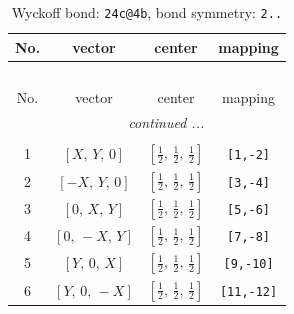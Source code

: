 \documentclass[fleqn,8pt]{jsarticle}
\begin{document}
\renewcommand{\arraystretch}{1.2}
\begin{longtable}{cccc}
\caption{Wyckoff bond: {\tt 24c@4b}, bond symmetry: {\tt 2..}}
 \\
 \hline \hline
No. & vector & center & mapping \\ \hline \endfirsthead

\multicolumn{3}{l}{\tablename\ \thetable{}} \\
 \hline \hline
No. & vector & center & mapping \\ \hline \endhead

 \hline \hline
\multicolumn{3}{r}{\footnotesize\it continued ...} \\ \endfoot

 \hline \hline
\multicolumn{3}{r}{} \\ \endlastfoot

1 & $\left[ X,\, Y,\, 0 \right]$ & $\left[ \frac{1}{2},\, \frac{1}{2},\, \frac{1}{2} \right]$ & {\tt [1,-2]} \\ \hline
2 & $\left[ - X,\, Y,\, 0 \right]$ & $\left[ \frac{1}{2},\, \frac{1}{2},\, \frac{1}{2} \right]$ & {\tt [3,-4]} \\ \hline
3 & $\left[ 0,\, X,\, Y \right]$ & $\left[ \frac{1}{2},\, \frac{1}{2},\, \frac{1}{2} \right]$ & {\tt [5,-6]} \\ \hline
4 & $\left[ 0,\, - X,\, Y \right]$ & $\left[ \frac{1}{2},\, \frac{1}{2},\, \frac{1}{2} \right]$ & {\tt [7,-8]} \\ \hline
5 & $\left[ Y,\, 0,\, X \right]$ & $\left[ \frac{1}{2},\, \frac{1}{2},\, \frac{1}{2} \right]$ & {\tt [9,-10]} \\ \hline
6 & $\left[ Y,\, 0,\, - X \right]$ & $\left[ \frac{1}{2},\, \frac{1}{2},\, \frac{1}{2} \right]$ & {\tt [11,-12]} \\
\end{longtable}
\renewcommand{\arraystretch}{1.2}
\end{document}
